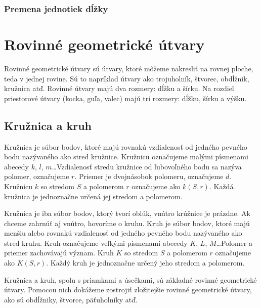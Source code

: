 \documentclass{article}
\begin{document}
\subsubsection{Premena jednotiek dĺžky}

\section{Rovinné geometrické útvary}

Rovinné geometrické útvary sú útvary, ktoré môžeme nakresliť na rovnej ploche, teda v jednej rovine. Sú to napríklad útvary ako trojuholník, štvorec, obdĺžnik, kružnica atď. Rovinné útvary majú dva rozmery: dĺžku a šírku. Na rozdiel priestorové útvary (kocka, guľa, valec) majú tri rozmery: dĺžku, šírku a výšku.

\subsection{Kružnica a kruh}

Kružnica je súbor bodov, ktoré majú rovnakú vzdialenosť od jedného pevného bodu nazývaného ako stred kružnice. Kružnicu označujeme malými písmenami abecedy \(k\), \(l\), \(m\)\dots Vzdialenosť stredu kružnice od ľubovoľného bodu sa nazýva polomer, označujeme \(r\). Priemer je dvojnásobok polomeru, označujeme \(d\). Kružnicu \(k\) so stredom \(S\) a polomerom \(r\) označujeme ako \(k(S, r)\). Každá kružnica je jednoznačne určená jej stredom a polomerom.

Kružnica je iba súbor bodov, ktorý tvorí oblúk, vnútro krúžnice je prázdne. Ak chceme zahrnúť aj vnútro, hovoríme o kruhu. Kruh je súbor bodov, ktoré majú menšiu alebo rovnakú vzdialenosť od jedného pevného bodu nazývaného ako stred kruhu. Kruh označujeme veľkými písmenami abecedy \(K\), \(L\), \(M\)\dots Polomer a priemer zachovávajú význam. Kruh \(K\) so stredom \(S\) a polomerom \(r\) označujeme ako \(K(S, r)\). Každý kruh je jednoznačne určený jeho stredom a polomerom.

Kružnica a kruh, spolu s priamkami a úsečkami, sú základné rovinné geometrické útvary. Pomocou nich dokážeme zostrojiť zložitejšie rovinné geometrické útvary, ako sú obdĺžniky, štvorce, päťuholníky atď.
\end{document}
